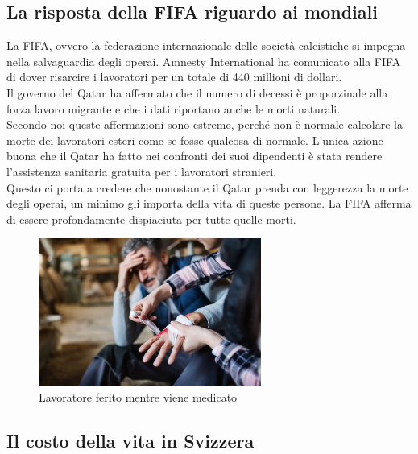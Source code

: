 \documentclass[a4paper, 12pt]{article}
\begin{document}
\pagebreak

\subsection{La risposta della FIFA riguardo ai mondiali}

La FIFA, ovvero la federazione internazionale delle società calcistiche si impegna nella salvaguardia degli operai. Amnesty International ha comunicato alla FIFA di dover risarcire i lavoratori per un totale di 440 millioni di dollari. \\ Il governo del Qatar ha affermato che il numero di decessi è proporzinale alla forza lavoro migrante e che i dati riportano anche le morti naturali. \cite{cosaPensaFIFA} \\ Secondo noi queste affermazioni sono estreme, perché non è normale calcolare la morte dei lavoratori esteri come se fosse qualcosa di normale. L'unica azione buona che il Qatar ha fatto nei confronti dei suoi dipendenti è stata rendere l'assistenza sanitaria gratuita per i lavoratori stranieri. \\ Questo ci porta a credere che nonostante il Qatar prenda con leggerezza la morte degli operai, un minimo gli importa della vita di queste persone. La FIFA afferma di essere profondamente dispiaciuta per tutte quelle morti.

\begin{figure}[h]
    \centering
    \includegraphics[width=0.65\textwidth]{images/mondiali_qatar_2022_lavoratori.png}
    \caption{Lavoratore ferito mentre viene medicato}
\end{figure}


\pagebreak

\subsection{Il costo della vita in Svizzera}
\end{document}
